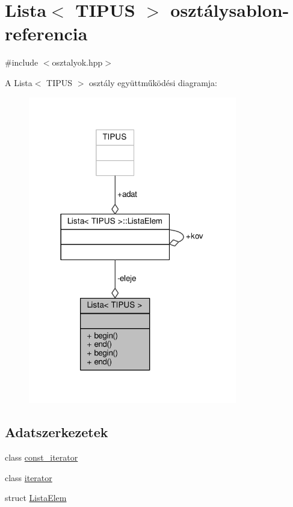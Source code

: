\hypertarget{classLista}{}\section{Lista$<$ T\+I\+P\+US $>$ osztálysablon-\/referencia}
\label{classLista}


{\ttfamily \#include $<$osztalyok.\+hpp$>$}



A Lista$<$ T\+I\+P\+US $>$ osztály együttműködési diagramja\+:\nopagebreak
\begin{figure}[H]
\begin{center}
\leavevmode
\includegraphics[width=258pt]{classLista__coll__graph}
\end{center}
\end{figure}
\subsection*{Adatszerkezetek}
\begin{DoxyCompactItemize}
\item 
class \hyperlink{classLista_classLista_1_1const__iterator}{const\+\_\+iterator}
\item 
class \hyperlink{classLista_classLista_1_1iterator}{iterator}
\item 
struct \hyperlink{classLista_structLista_1_1ListaElem}{Lista\+Elem}
\end{DoxyCompactItemize}
